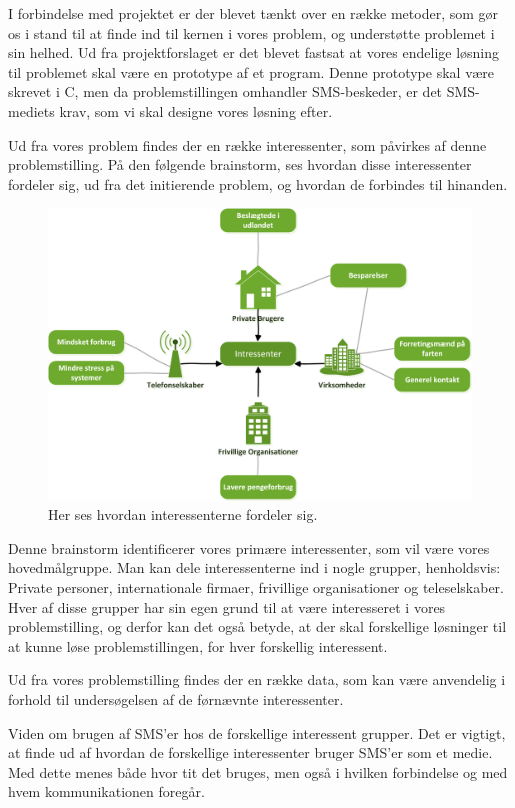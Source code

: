 I forbindelse med projektet er der blevet tænkt over en række metoder, som gør os i stand til at finde ind til kernen i vores problem, og understøtte problemet i sin helhed.
Ud fra projektforslaget er det blevet fastsat at vores endelige løsning til problemet skal være en prototype af et program. Denne prototype skal være skrevet i C, men da problemstillingen omhandler SMS-beskeder, er det  SMS-mediets krav, som vi skal designe vores løsning efter.


Ud fra vores problem findes der en række interessenter, som påvirkes af denne problemstilling.
På den følgende brainstorm, ses hvordan disse interessenter fordeler sig, ud fra det initierende problem, og hvordan de forbindes til hinanden.

\begin{figure}[H]
\includegraphics[width=\linewidth]{Billeder/Brainstormting.png}
\caption{Her ses hvordan interessenterne fordeler sig.}
\end{figure}

Denne brainstorm identificerer vores primære interessenter, som vil være vores hovedmålgruppe.
Man kan dele interessenterne ind i nogle grupper, henholdsvis: Private personer, internationale firmaer, frivillige organisationer og teleselskaber.
Hver af disse grupper har sin egen grund til at være interesseret i vores problemstilling, og derfor kan det også betyde, at der skal forskellige løsninger til at kunne løse problemstillingen, for hver forskellig interessent.


Ud fra vores problemstilling findes der en række data, som kan være anvendelig i forhold til undersøgelsen af de førnævnte interessenter.


Viden om brugen af SMS'er hos de forskellige interessent grupper.
Det er vigtigt, at finde ud af hvordan de forskellige interessenter bruger SMS'er som et medie. Med dette menes både hvor tit det bruges, men også i hvilken forbindelse og med hvem kommunikationen foregår.